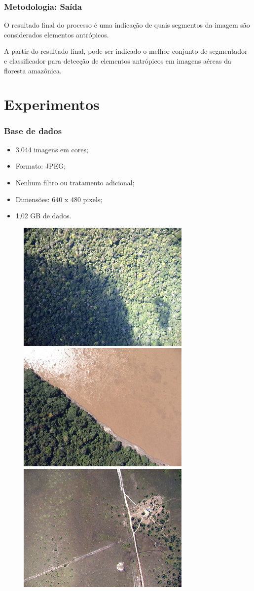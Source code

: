 \documentclass[t]{beamer}
\begin{document}
\begin{frame}[c]
	\frametitle{Metodologia: Saída}

	O resultado final do processo é uma indicação de quais segmentos da imagem são considerados elementos antrópicos.

	\vspace{0.5cm}	

	A partir do resultado final, pode ser indicado o melhor conjunto de segmentador e classificador para detecção de elementos antrópicos em imagens aéreas da floresta amazônica.

\end{frame}


\section{Experimentos}

\begin{frame}[c]
	\frametitle{Base de dados}

	\begin{itemize}
		\item 3.044 imagens em cores;
		\item Formato: JPEG;
		\item Nenhum filtro ou tratamento adicional;
		\item Dimensões: 640 x 480 pixels;
		\item 1,02 GB de dados.
	\end{itemize}

	\begin{figure}[h]
		\includegraphics[width=.3\textwidth]{imgs/amostra1}
		\hspace{0.1cm}
		\includegraphics[width=.3\textwidth]{imgs/amostra2}
		\hspace{0.1cm}
		\includegraphics[width=.3\textwidth]{imgs/amostra3}
	\end{figure}

\end{frame}
\end{document}
